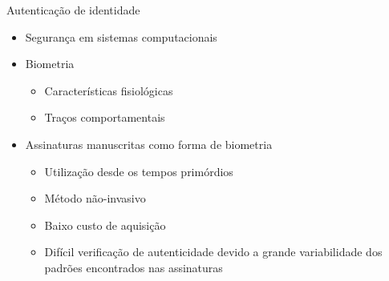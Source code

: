 
\begin{frame}{Autenticação de identidade}
	\baselineskip
	\begin{itemize}
		\item Segurança em sistemas computacionais
		\bigskip
		\item Biometria
		\begin{itemize}
			\item Características fisiológicas
			\item Traços comportamentais
		\end{itemize}
		\bigskip
		\item Assinaturas manuscritas como forma de biometria
		\begin{itemize}
			\item Utilização desde os tempos primórdios
			\item Método não-invasivo
			\item Baixo custo de aquisição
			\item Difícil verificação de autenticidade devido a grande variabilidade dos padrões encontrados nas assinaturas
		\end{itemize}
	\end{itemize}
\end{frame}

